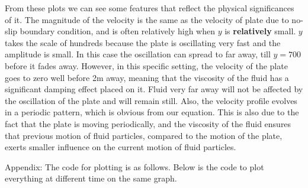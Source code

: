 \documentclass{article}
\begin{document}
  From these plots we can see some features that reflect the physical significances of it. The magnitude of the velocity is the same as the velocity of plate due to no-slip boundary condition, and is often relatively high when $y$ is \textbf{relatively} small. $y$ takes the scale of hundreds because the plate is oscillating very fast and the amplitude is small. In this case the oscillation can spread to far away, till $y = 700$ before it fades away. However, in this specific setting, the velocity of the plate goes to zero well before 2m away, meaning that the viscosity of the fluid has a significant damping effect placed on it. Fluid very far away will not be affected by the oscillation of the plate and will remain still. Also, the velocity profile evolves in a periodic pattern, which is obvious from our equation. This is also due to the fact that the plate is moving periodically, and the viscosity of the fluid ensures that previous motion of fluid particles, compared to the motion of the plate, exerts smaller influence on the current motion of fluid particles.

\clearpage
\appendix
Appendix:
The code for plotting is as follows.
Below is the code to plot everything at different time on the same graph.



%  
  
%
%
%
\end{document}
